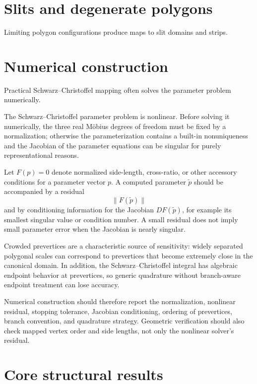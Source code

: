 \section{Slits and degenerate polygons}
Limiting polygon configurations produce maps to slit domains and strips.

\section{Numerical construction}
Practical Schwarz–Christoffel mapping often solves the parameter problem numerically.

\begin{remark}
The Schwarz--Christoffel parameter problem is nonlinear.  Before solving it
numerically, the three real M\"obius degrees of freedom must be fixed by a
normalization; otherwise the parameterization contains a built-in
nonuniqueness and the Jacobian of the parameter equations can be singular for
purely representational reasons.

Let \(F(p)=0\) denote normalized side-length, cross-ratio, or other accessory
conditions for a parameter vector \(p\).  A computed parameter
\(\widetilde p\) should be accompanied by a residual
\[
\|F(\widetilde p)\|
\]
and by conditioning information for the Jacobian \(DF(\widetilde p)\), for
example its smallest singular value or condition number.  A small residual
does not imply small parameter error when the Jacobian is nearly singular.

Crowded prevertices are a characteristic source of sensitivity: widely
separated polygonal scales can correspond to prevertices that become extremely
close in the canonical domain.  In addition, the Schwarz--Christoffel integral
has algebraic endpoint behavior at prevertices, so generic quadrature without
branch-aware endpoint treatment can lose accuracy.

Numerical construction should therefore report the normalization, nonlinear
residual, stopping tolerance, Jacobian conditioning, ordering of prevertices,
branch convention, and quadrature strategy.  Geometric verification should
also check mapped vertex order and side lengths, not only the nonlinear
solver's residual.
\end{remark}

\section{Core structural results}

